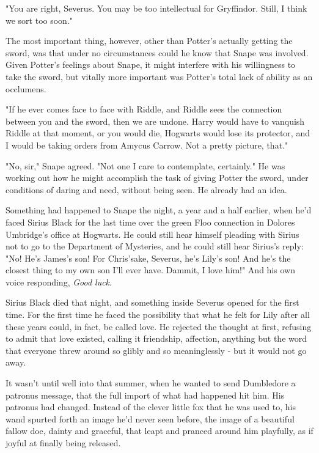 \documentclass[a4paper,11pt]{article}
\begin{document}
"You are right, Severus. You may be too intellectual for Gryffindor. Still, I think we sort too soon."

The most important thing, however, other than Potter's actually getting the sword, was that under no circumstances could he know that Snape was involved. Given Potter's feelings about Snape, it might interfere with his willingness to take the sword, but vitally more important was Potter's total lack of ability as an occlumens.

"If he ever comes face to face with Riddle, and Riddle sees the connection between you and the sword, then we are undone. Harry would have to vanquish Riddle at that moment, or you would die, Hogwarts would lose its protector, and I would be taking orders from Amycus Carrow. Not a pretty picture, that."

"No, sir," Snape agreed. "Not one I care to contemplate, certainly." He was working out how he might accomplish the task of giving Potter the sword, under conditions of daring and need, without being seen. He already had an idea.

Something had happened to Snape the night, a year and a half earlier, when he'd faced Sirius Black for the last time over the green Floo connection in Dolores Umbridge's office at Hogwarts. He could still hear himself pleading with Sirius not to go to the Department of Mysteries, and he could still hear Sirius's reply: "No! He's James's son! For Chris'sake, Severus, he's Lily's son! And he's the closest thing to my own son I'll ever have. Dammit, I love him!" And his own voice responding, \emph{Good luck}.

Sirius Black died that night, and something inside Severus opened for the first time. For the first time he faced the possibility that what he felt for Lily after all these years could, in fact, be called love. He rejected the thought at first, refusing to admit that love existed, calling it friendship, affection, anything but the word that everyone threw around so glibly and so meaninglessly - but it would not go away.

It wasn't until well into that summer, when he wanted to send Dumbledore a patronus message, that the full import of what had happened hit him. His patronus had changed. Instead of the clever little fox that he was used to, his wand spurted forth an image he'd never seen before, the image of a beautiful fallow doe, dainty and graceful, that leapt and pranced around him playfully, as if joyful at finally being released.
\end{document}
